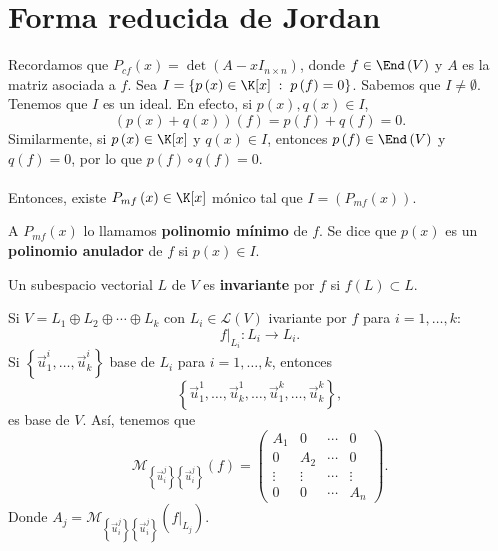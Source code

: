 \section{Forma reducida de Jordan}
Recordamos que $\displaystyle P_{cf}\left(x\right) = \det\left(A - xI_{n\times n}\right) $, donde $\displaystyle f \in \End\left(V\right) $ y $\displaystyle A $ es la matriz asociada a $\displaystyle f $. Sea $\displaystyle I = \left\{ p\left(x\right) \in \K[x] \; : \; p\left(f\right) = 0\right\}  $. Sabemos que $\displaystyle I \neq \emptyset $. 
Tenemos que $\displaystyle I $ es un ideal. En efecto, si $\displaystyle p\left(x\right), q\left(x\right) \in I $,
\[ \left(p\left(x\right)+q\left(x\right)\right)\left(f\right) = p\left(f\right) + q\left(f\right)= 0 .\]
Similarmente, si $\displaystyle p\left(x\right) \in \K[x] $ y $\displaystyle q\left(x\right) \in I $, entonces $\displaystyle p\left(f\right) \in \End\left(V\right) $ y $\displaystyle q\left(f\right) = 0 $, por lo que $\displaystyle p\left(f\right) \circ q\left(f\right) = 0 $. \\ \\
Entonces, existe $\displaystyle P_{mf}\left(x\right) \in \K[x] $ mónico tal que $\displaystyle I = \left(P_{mf}\left(x\right)\right) $.
\begin{fdefinition}[]
\normalfont A $\displaystyle P_{mf}\left(x\right) $ lo llamamos \textbf{polinomio mínimo} de $\displaystyle f $. Se dice que $\displaystyle p\left(x\right) $ es un \textbf{polinomio anulador} de $\displaystyle f $ si $\displaystyle p\left(x\right) \in I $.
\end{fdefinition}
\begin{fdefinition}[]
\normalfont Un subespacio vectorial $\displaystyle L $ de $\displaystyle V $ es \textbf{invariante} por $\displaystyle f $ si $\displaystyle f\left(L\right) \subset L $.
\end{fdefinition}
\begin{observation}
\normalfont Si $\displaystyle V = L_{1} \oplus L_{2} \oplus \cdots \oplus L_{k} $ con $\displaystyle L_{i} \in \mathcal{L}\left(V\right) $ ivariante por $\displaystyle f $ para $\displaystyle i = 1, \ldots, k $:
\[f|_{L_{i}}:L_{i} \to L_{i} .\]
Si $\displaystyle \left\{ \vec{u}^{i}_{1}, \ldots, \vec{u}^{i}_{k}\right\}  $ base de $\displaystyle L_{i} $ para $\displaystyle i = 1, \ldots, k $, entonces 
\[ \left\{ \vec{u}^{1}_{1}, \ldots, \vec{u}^{1}_{k}, \ldots, \vec{u}^{k}_{1}, \ldots, \vec{u}^{k}_{k}\right\}  ,\]
es base de $\displaystyle V $. Así, tenemos que 
\[ \mathcal{M}_{ \left\{ \vec{u}^{j}_{i}\right\} \left\{ \vec{u}^{j}_{i}\right\} }\left(f\right) = \begin{pmatrix} A_{1} & 0 & \cdots & 0 \\
0 & A_{2} & \cdots & 0 \\
\vdots & \vdots & \cdots & \vdots \\
0 & 0 & \cdots & A_{n}\end{pmatrix} .\]
Donde $\displaystyle A_{j} = \mathcal{M}_{ \left\{ \vec{u}^{j}_{i}\right\} \left\{ \vec{u}^{j}_{i}\right\} } \left(f|_{L_{j}}\right)$.
\end{observation}
